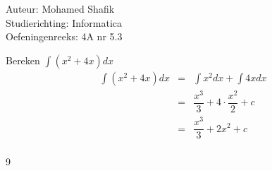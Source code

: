 \documentclass[a4paper]{article}
\begin{document}
\noindent \large Auteur: Mohamed Shafik \\
\noindent \large Studierichting: Informatica\\
\noindent \large Oefeningenreeks: 4A nr 5.3\\

\medskip

\normalsize

Bereken $\displaystyle\int (x^2 + 4x) dx$\\

\begin{eqnarray*}
\displaystyle\int (x^2 + 4x) dx &=& \displaystyle\int x^2 dx + \displaystyle\int 4x dx\\
&=& \dfrac{x^3}{3} + 4 \cdot \dfrac{x^2}{2} + c\\
&=& \dfrac{x^3}{3} + 2x^2 + c\\
\end{eqnarray*}

\begin{thebibliography}{9}
\end{thebibliography}
\end{document}
